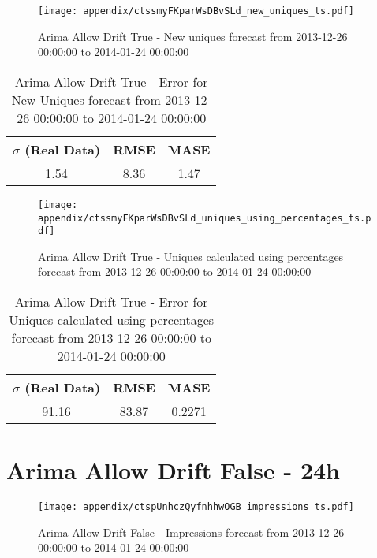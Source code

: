 \begin{figure}[H] \begin{center} \leavevmode
\texttt{[image: appendix/ctssmyFKparWsDBvSLd\_new\_uniques\_ts.pdf]} \caption{
Arima Allow Drift True - New uniques forecast from 2013-12-26 00:00:00 to 2014-01-24 00:00:00} \label{fig:appendix/ctssmyFKparWsDBvSLd_new_uniques_ts.pdf} \end{center}
\end{figure}

\begin{table}[H]
\centering
\footnotesize
\begin{tabular}{ccc}
$\sigma$ (Real Data) & RMSE & MASE   \\ \hline
1.54 & 8.36 & 1.47 \\
\end{tabular}

\vspace{0.5cm}

\caption{
Arima Allow Drift True - Error for New Uniques forecast from 2013-12-26 00:00:00 to 2014-01-24 00:00:00}
\end{table}

\begin{figure}[H] \begin{center} \leavevmode
\texttt{[image: appendix/ctssmyFKparWsDBvSLd\_uniques\_using\_percentages\_ts.pdf]} \caption{
Arima Allow Drift True - Uniques calculated using percentages forecast from 2013-12-26 00:00:00 to 2014-01-24 00:00:00} \label{fig:appendix/ctssmyFKparWsDBvSLd_uniques_using_percentages_ts.pdf} \end{center}
\end{figure}

\begin{table}[H]
\centering
\footnotesize
\begin{tabular}{ccc}
$\sigma$ (Real Data) & RMSE & MASE   \\ \hline
91.16 & 83.87 & 0.2271 \\
\end{tabular}

\vspace{0.5cm}

\caption{
Arima Allow Drift True - Error for Uniques calculated using percentages forecast from 2013-12-26 00:00:00 to 2014-01-24 00:00:00}
\end{table}

\section{Arima Allow Drift False - 24h}
\begin{figure}[H] \begin{center} \leavevmode
\texttt{[image: appendix/ctspUnhczQyfnhhwOGB\_impressions\_ts.pdf]} \caption{
Arima Allow Drift False - Impressions forecast from 2013-12-26 00:00:00 to 2014-01-24 00:00:00} \label{fig:appendix/ctspUnhczQyfnhhwOGB_impressions_ts.pdf} \end{center}
\end{figure}

